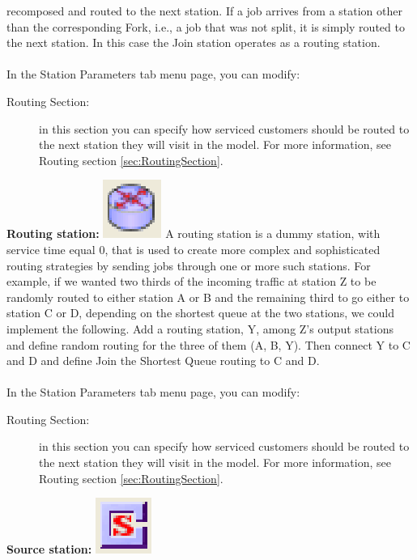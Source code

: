 \begin{enumerate*}
recomposed and routed to the next station. If a job arrives from a station other than the corresponding Fork, i.e., a job that was not split, it is simply routed to the next station. In this case the Join station operates as a routing station.\\\\
In the Station Parameters tab menu page, you can modify:
\begin{description}
\item[Routing Section:] in this section you can specify how serviced customers should be routed to the next station they will visit in the model.
For more information, see Routing section \ref{sec:RoutingSection}.
\end{description}
\item \textbf{Routing station:} \includegraphics[scale=1]{img/jsim/load_splitter.eps}
A routing station is a dummy station, with service time equal 0, that is used to create more complex and sophisticated routing strategies by sending jobs through one or more such stations. For example, if we wanted two thirds of the incoming traffic at station Z to be randomly routed to either station A or B and the remaining third to go either to station C or D, depending on the shortest queue at the two stations, we could implement the following. Add a routing station, Y, among Z's output stations and define random routing for the three of them (A, B, Y).
Then connect Y to C and D and define Join the Shortest Queue routing to C and D.\\\\
In the Station Parameters tab menu page, you can modify:
\begin{description}
\item[Routing Section:] in this section you can specify how serviced customers should be routed to the next station they will visit in the model.
For more information, see Routing section \ref{sec:RoutingSection}.
\end{description}
\item \textbf{Source station:} \includegraphics[scale=1]{img/jsim/source.eps}

\end{enumerate*}
